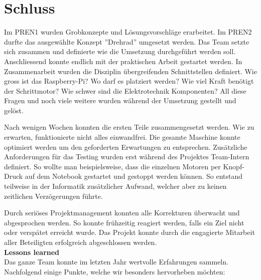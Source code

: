 \section{Schluss}

Im PREN1 wurden Grobkonzepte und Lösungsvorschläge erarbeitet. Im PREN2 durfte das ausgewählte Konzept ''Drehrad'' umgesetzt werden. Das Team setzte sich zusammen und definierte wie die Umsetzung durchgeführt werden soll. Anschliessend konnte endlich mit der praktischen Arbeit gestartet werden. In Zusammenarbeit wurden die Disziplin übergreifenden Schnittstellen definiert. Wie gross ist das Raspberry-Pi? Wo darf es platziert werden? Wie viel Kraft benötigt der Schrittmotor? Wie schwer sind die Elektrotechnik Komponenten? All diese Fragen und noch viele weitere wurden während der Umsetzung gestellt und gelöst.

Nach wenigen Wochen konnten die ersten Teile zusammengesetzt werden. Wie zu erwarten, funktionierte nicht alles einwandfrei. Die gesamte Maschine konnte optimiert werden um den geforderten Erwartungen zu entsprechen. Zusätzliche Anforderungen für das Testing wurden erst während des Projektes Team-Intern definiert. So wollte man beispielsweise, dass die einzelnen Motoren per Knopf-Druck auf dem Notebook gestartet und gestoppt werden können. So entstand teilweise in der Informatik zusätzlicher Aufwand, welcher aber zu keinen zeitlichen Verzögerungen führte.

Durch seriöses Projektmanagement konnten alle Korrekturen überwacht und abgesprochen werden. So konnte frühzeitig reagiert werden, falls ein Ziel nicht oder verspätet erreicht wurde. Das Projekt konnte durch die engagierte Mitarbeit aller Beteiligten erfolgreich abgeschlossen werden.\\

\noindent
\textbf{Lessons learned}
\\
Das ganze Team konnte im letzten Jahr wertvolle Erfahrungen sammeln. Nachfolgend einige Punkte, welche wir besonders hervorheben möchten:

